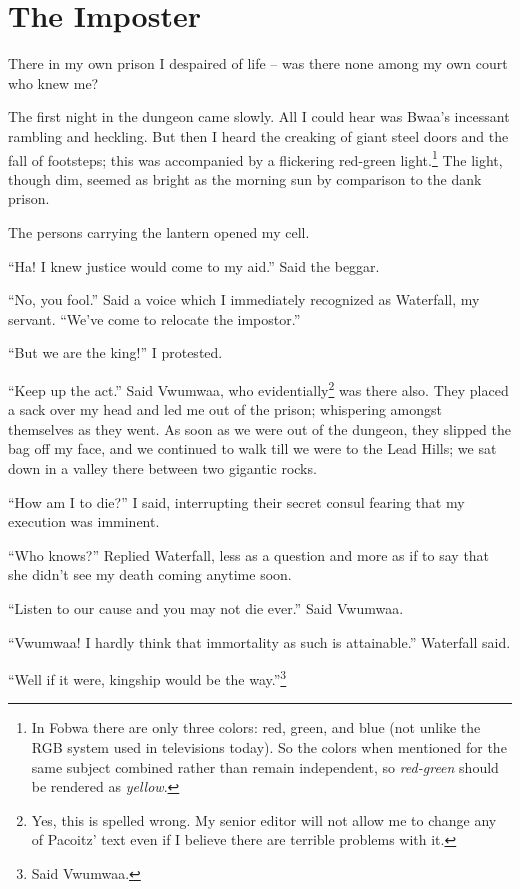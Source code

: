 \chapter{The Imposter}

There in my own prison I despaired of life -- was there none among my own court who knew me?

The first night in the dungeon came slowly. All I could hear was Bwaa's incessant rambling and heckling. But then I heard the creaking of giant steel doors and the fall of footsteps; this was accompanied by a flickering red-green light.\footnote{In Fobwa there are only three colors: red, green, and blue (not unlike the RGB system used in televisions today). So the colors when mentioned for the same subject combined rather than remain independent, so \emph{red-green} should be rendered as \emph{yellow}.}
The light, though dim, seemed as bright as the morning sun by comparison to the dank prison.

The persons carrying the lantern opened my cell.

``Ha! I knew justice would come to my aid.'' Said the beggar.

``No, you fool.'' Said a voice which I immediately recognized as Waterfall, my servant. ``We've come to relocate the impostor.''

``But we are the king!'' I protested.

``Keep up the act.'' Said Vwu\-mwaa, who evi\-dent\-ially\footnote{Yes, this is spelled wrong. My senior editor will not allow me to change any of Pa\-co\-itz' text even if I believe there are terrible problems with it.} was there also.
They placed a sack over my head and led me out of the prison; whispering amongst themselves as they went. As soon as we were out of the dungeon, they slipped the bag off my face, and we continued to walk till we were to the Lead Hills; we sat down in a valley there between two gigantic rocks.

``How am I to die?'' I said, interrupting their secret consul fearing that my execution was imminent.

``Who knows?'' Replied Waterfall, less as a question and more as if to say that she didn't see my death coming anytime soon.

``Listen to our cause and you may not die ever.'' Said Vwu\-mwaa.

``Vwu\-mwaa! I hardly think that immortality as such is attainable.'' Waterfall said.

``Well if it were, kingship would be the way.''\footnote{Said Vwu\-mwaa.}

